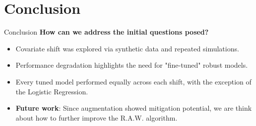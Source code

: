 \section{Conclusion}
\begin{frame}{Conclusion}
    \centering
    \Large
    \textbf{How can we address the initial questions posed?} 
    \large
    \vspace{0.1em}
    \begin{itemize}
        \item Covariate shift was explored via synthetic data and repeated simulations.
        \item Performance degradation highlights the need for "fine-tuned" robust models.
        \item Every tuned model performed equally across each shift, with the exception of the Logistic Regression.
        \item \textbf{Future work}: Since augmentation showed mitigation potential, we are think about how to further improve the R.A.W. algorithm.
    \end{itemize}
\end{frame}